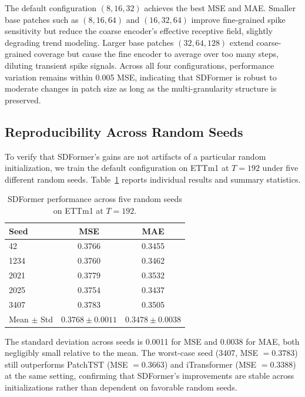 \documentclass[journal]{IEEEtran}
\begin{document}
The default configuration $(8, 16, 32)$ achieves the best MSE and MAE.
Smaller base patches such as $(8, 16, 64)$ and $(16, 32, 64)$ improve
fine-grained spike sensitivity but reduce the coarse encoder's effective
receptive field, slightly degrading trend modeling.
Larger base patches $(32, 64, 128)$ extend coarse-grained coverage but
cause the fine encoder to average over too many steps, diluting transient
spike signals.
Across all four configurations, performance variation remains within 0.005
MSE, indicating that SDFormer is robust to moderate changes in patch size
as long as the multi-granularity structure is preserved.

\subsection{Reproducibility Across Random Seeds}

To verify that SDFormer's gains are not artifacts of a particular random
initialization, we train the default configuration on ETTm1 at $T = 192$
under five different random seeds.
Table~\ref{tab:seeds} reports individual results and summary statistics.

\begin{table}[!t]
\caption{SDFormer performance across five random seeds on ETTm1 at $T=192$.}
\label{tab:seeds}
\centering
\renewcommand{\arraystretch}{1.15}
\begin{tabular}{lcc}
\toprule
\textbf{Seed} & \textbf{MSE} & \textbf{MAE} \\
\midrule
42    & 0.3766 & 0.3455 \\
1234  & 0.3760 & 0.3462 \\
2021  & 0.3779 & 0.3532 \\
2025  & 0.3754 & 0.3437 \\
3407  & 0.3783 & 0.3505 \\
\midrule
Mean $\pm$ Std & $0.3768 \pm 0.0011$ & $0.3478 \pm 0.0038$ \\
\bottomrule
\end{tabular}
\end{table}

The standard deviation across seeds is 0.0011 for MSE and 0.0038 for MAE,
both negligibly small relative to the mean.
The worst-case seed (3407, MSE $= 0.3783$) still outperforms PatchTST
(MSE $= 0.3663$) and iTransformer (MSE $= 0.3388$) at the same setting,
confirming that SDFormer's improvements are stable across initializations
rather than dependent on favorable random seeds.
\end{document}
